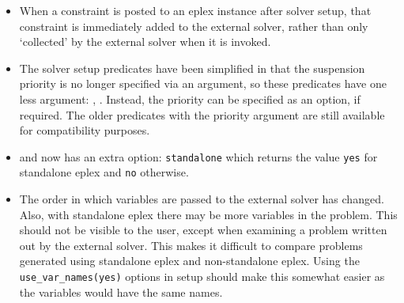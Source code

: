 \begin{sloppypar}
\begin{itemize}
\item When a constraint is posted to an eplex instance after solver setup,
that constraint is immediately added to the external solver, rather than
only `collected' by the external solver when it is invoked. 

\item The solver setup predicates have been simplified in that the
suspension priority is no longer specified via an argument, so these
predicates have one less argument:
,
. Instead, the priority can be specified as an option, if
required. The older predicates with the priority argument are still
available for compatibility purposes.
\item {} and  now has an extra option:
\verb'standalone' which returns the value \verb'yes' for standalone eplex
and \verb'no' otherwise.

\item The order in which variables are passed to the external solver has
  changed. Also, with standalone eplex there may be more variables in the
  problem. This should not be visible to the user, except when examining a
  problem written out by the external solver. This makes it difficult to
  compare problems generated using standalone eplex and non-standalone
  eplex. Using the \verb'use_var_names(yes)' options in setup should make
  this somewhat easier as the variables would have the same names.

\end{itemize}
\end{sloppypar}
